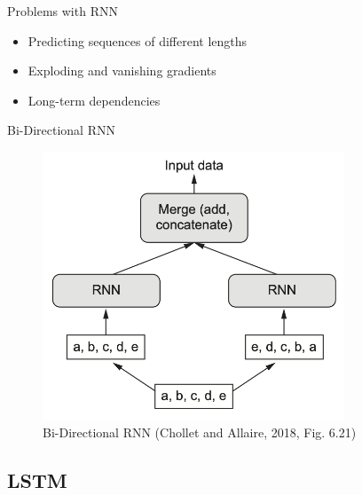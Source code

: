 \documentclass[10pt]{beamer}
\begin{document}
\begin{frame}{Problems with RNN}

\begin{itemize}
\item Predicting sequences of {\color{uured} different lengths}
\item {\color{uured} Exploding and vanishing} gradients
\item {\color{uured} Long-term}  dependencies
\end{itemize}

\end{frame}

\begin{frame}{Bi-Directional RNN}

\begin{figure}[h]
\centering
\includegraphics[width=0.8\textwidth]{fig/DLR_6_21_BiRNN}
\caption{Bi-Directional RNN (Chollet and Allaire, 2018, Fig. 6.21)}
\end{figure}

\end{frame}



\subsection{LSTM}
\end{document}
